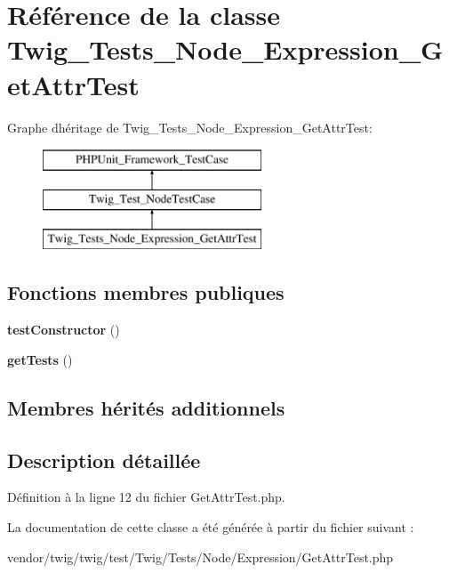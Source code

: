 \hypertarget{class_twig___tests___node___expression___get_attr_test}{}\section{Référence de la classe Twig\+\_\+\+Tests\+\_\+\+Node\+\_\+\+Expression\+\_\+\+Get\+Attr\+Test}
\label{class_twig___tests___node___expression___get_attr_test}
Graphe d\textquotesingle{}héritage de Twig\+\_\+\+Tests\+\_\+\+Node\+\_\+\+Expression\+\_\+\+Get\+Attr\+Test\+:\begin{figure}[H]
\begin{center}
\leavevmode
\includegraphics[height=3.000000cm]{class_twig___tests___node___expression___get_attr_test}
\end{center}
\end{figure}
\subsection*{Fonctions membres publiques}
\begin{DoxyCompactItemize}
\item 
{\bfseries test\+Constructor} ()\hypertarget{class_twig___tests___node___expression___get_attr_test_a47094dc941e72950570900d1418f89c6}{}\label{class_twig___tests___node___expression___get_attr_test_a47094dc941e72950570900d1418f89c6}

\item 
{\bfseries get\+Tests} ()\hypertarget{class_twig___tests___node___expression___get_attr_test_a7e247dd31cc8d37a6c97353a062a0080}{}\label{class_twig___tests___node___expression___get_attr_test_a7e247dd31cc8d37a6c97353a062a0080}

\end{DoxyCompactItemize}
\subsection*{Membres hérités additionnels}


\subsection{Description détaillée}


Définition à la ligne 12 du fichier Get\+Attr\+Test.\+php.



La documentation de cette classe a été générée à partir du fichier suivant \+:\begin{DoxyCompactItemize}
\item 
vendor/twig/twig/test/\+Twig/\+Tests/\+Node/\+Expression/Get\+Attr\+Test.\+php\end{DoxyCompactItemize}
